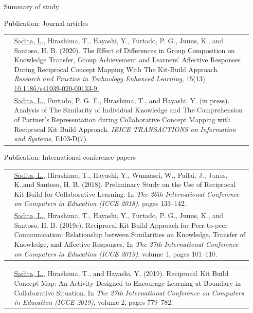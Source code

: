 \begin{frame}{Summary of study}
    
\end{frame}

\begin{frame}{Publication: Journal articles}
\begin{tabular}{p{15mm}p{80mm}}
    \tiny{\color{blue}{RPTEL 2020}} & {\small \underline{Sadita,  L.},  Hirashima,  T.,  Hayashi,  Y.,  Furtado,  P.  G.,  Junus,  K.,  and Santoso,  H.  B.  (2020).   The  Effect  of  Differences  in  Group  Composition on Knowledge Transfer, Group Achievement and Learners' Affective Responses During Reciprocal Concept Mapping With The Kit-Build Approach. \textit{Research and Practice in Technology Enhanced Learning}, 15(13).  \href{https://doi.org/10.1186/s41039-020-00133-9}{10.1186/s41039-020-00133-9.}}\\
    \tiny{\color{blue}{IEICE 2020}} & {\small\underline{Sadita, L.}, Furtado, P. G. F., Hirashima, T., and Hayashi, Y. (in press). Analysis of The Similarity of Individual Knowledge and The Comprehension of Partner’s Representation during Collaborative Concept Mapping with Reciprocal Kit Build Approach. \textit{IEICE  TRANSACTIONS  on Information and Systems}, E103-D(7)}. 
\end{tabular}
\end{frame}

\begin{frame}[allowframebreaks]{Publication: International conference papers}
\begin{tabular}{p{15mm}p{80mm}}
    \tiny{\color{blue}{ICCE 2018}} & {\small\underline{Sadita, L.}, Hirashima, T., Hayashi, Y., Wunnasri, W., Pailai, J., Junus, K.,and Santoso, H. B. (2018). Preliminary Study on the Use of Reciprocal Kit Build for Collaborative Learning.  In \textit{The  26th  International  Conference on Computers in Education (ICCE 2018)}, pages 133–142.}\\
    
    \tiny{\color{blue}{ICCE 2019}} & {\small \underline{Sadita,  L.},  Hirashima,  T.,  Hayashi,  Y.,  Furtado,  P.  G.,  Junus,  K.,  and Santoso, H. B. (2019c).  Reciprocal Kit Build Approach for Peer-to-peer Communication:  Relationship between Similarities on Knowledge, Transfer  of  Knowledge,  and  Affective  Responses. In \textit{The  27th International Conference  on  Computers  in  Education  (ICCE  2019)},  volume  1,  pages 101–110.}\\
\end{tabular}

\begin{tabular}{p{15mm}p{80mm}}
    \tiny{\color{blue}{ICCE-DSC 2019}} & {\small \underline{Sadita, L.}, Hirashima, T., and Hayashi, Y. (2019).  Reciprocal Kit Build Concept Map:  An Activity Designed to Encourage Learning at Boundary in Collaborative Situation.  In \textit{The 27th International Conference on Computers in Education (ICCE 2019)}, volume 2, pages 779–782.}
\end{tabular}
\end{frame}

